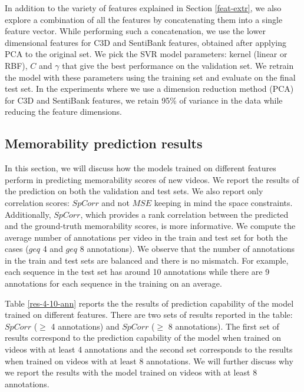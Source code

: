\documentclass[sigconf]{acmart}
\begin{document}
In addition to the variety of features explained in Section \ref{feat-extr}, we also explore a combination of all the features by concatenating them into a single feature vector.
While performing such a concatenation, we use the lower dimensional features for C3D and SentiBank features, obtained after applying PCA to the original set.
We pick the SVR model parameters: kernel (linear or RBF), $C$ and $\gamma$ that give the best performance on the validation set.
We retrain the model with these parameters using the training set and evaluate on the final test set.
In the experiments where we use a dimension reduction method (PCA) for C3D and SentiBank features, we retain 95\% of variance in the data while reducing the feature dimensions. 

\subsection{Memorability prediction results}
\label{pred-res}
In this section, we will discuss how the models trained on different features perform in predicting memorability scores of new videos.
We report the results of the prediction on both the validation and test sets.
We also report only correlation scores: $SpCorr$ and not $MSE$ keeping in mind the space constraints.
Additionally, $SpCorr$, which provides a rank correlation between the predicted and the ground-truth memorability scores, is more informative.
We compute the average number of annotations per video in the train and test set for both the cases ($geq$ 4 and $geq$ 8 annotations).
We observe that the number of annotations in the train and test sets are balanced and there is no mismatch.
For example, each sequence in the test set has around 10 annotations while there are 9 annotations for each sequence in the training on an average.

Table \ref{res-4-10-ann} reports the the results of prediction capability of the model trained on different features.
There are two sets of results reported in the table: $SpCorr$ ($\geq$ 4 annotations) and $SpCorr$ ($\geq$ 8 annotations).
The first set of results correspond to the prediction capability of the model when trained on videos with at least 4 annotations and the second set corresponds to the results when trained on videos with at least 8 annotations.
We will further discuss why we report the results with the model trained on videos with at least 8 annotations.
\end{document}
